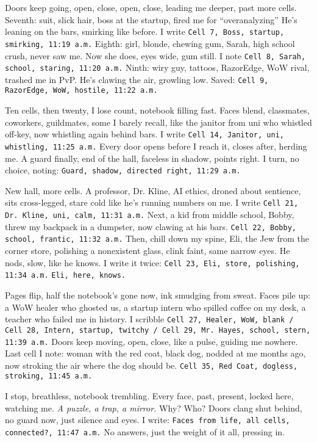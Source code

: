 \documentclass[12pt]{article}
\newcommand{\note}[1]{\texttt{#1}}
\begin{document}
Doors keep going, open, close, open, close, leading me deeper, past more cells. Seventh: suit, slick hair, boss at the startup, fired me for “overanalyzing” He’s leaning on the bars, smirking like before. I write \note{Cell 7, Boss, startup, smirking, 11:19 a.m.} Eighth: girl, blonde, chewing gum, Sarah, high school crush, never saw me. Now she does, eyes wide, gum still. I note \note{Cell 8, Sarah, school, staring, 11:20 a.m.} Ninth: wiry guy, tattoos, RazorEdge, WoW rival, trashed me in PvP. He’s clawing the air, growling low. Saved: \note{Cell 9, RazorEdge, WoW, hostile, 11:22 a.m.}

Ten cells, then twenty, I lose count, notebook filling fast. Faces blend, classmates, coworkers, guildmates, some I barely recall, like the janitor from uni who whistled off-key, now whistling again behind bars. I write \note{Cell 14, Janitor, uni, whistling, 11:25 a.m.} Every door opens before I reach it, closes after, herding me. A guard finally, end of the hall, faceless in shadow, points right. I turn, no choice, noting: \note{Guard, shadow, directed right, 11:29 a.m.}

New hall, more cells. A professor, Dr. Kline, AI ethics, droned about sentience, sits cross-legged, stare cold like he’s running numbers on me. I write \note{Cell 21, Dr. Kline, uni, calm, 11:31 a.m.} Next, a kid from middle school, Bobby, threw my backpack in a dumpster, now clawing at his bars. \note{Cell 22, Bobby, school, frantic, 11:32 a.m.} Then, chill down my spine, Eli, the Jew from the corner store, polishing a nonexistent glass, clink faint, same narrow eyes. He nods, slow, like he knows. I write it twice: \note{Cell 23, Eli, store, polishing, 11:34 a.m.} \note{Eli, here, knows.}

Pages flip, half the notebook’s gone now, ink smudging from sweat. Faces pile up: a WoW healer who ghosted us, a startup intern who spilled coffee on my desk, a teacher who failed me in history. I scribble \note{Cell 27, Healer, WoW, blank / Cell 28, Intern, startup, twitchy / Cell 29, Mr. Hayes, school, stern, 11:39 a.m.} Doors keep moving, open, close, like a pulse, guiding me nowhere. Last cell I note: woman with the red coat, black dog, nodded at me months ago, now stroking the air where the dog should be. \note{Cell 35, Red Coat, dogless, stroking, 11:45 a.m.}

I stop, breathless, notebook trembling. Every face, past, present, locked here, watching me. \textit{A puzzle, a trap, a mirror.} Why? Who? Doors clang shut behind, no guard now, just silence and eyes. I write: \note{Faces from life, all cells, connected?, 11:47 a.m.} No answers, just the weight of it all, pressing in.
\end{document}
